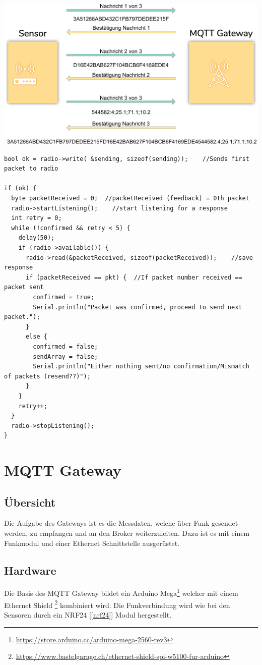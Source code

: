 \documentclass[
  12pt, %
  a4paper, %
  twoside, %
  openany, %
  numbers=noenddot, %
  BCOR=5mm, %
  parskip=half*, %
  thesis, %
]{bfhbook}
\begin{document}
\begin{center}
\includegraphics[width=17cm, left]{Bilder/Funkprotokoll.png}
 \captionsetup{justification=centering}
\label{radioprotocol}
\end{center}
\begin{verbatim}
bool ok = radio->write( &sending, sizeof(sending));    //Sends first packet to radio

if (ok) {
  byte packetReceived = 0;  //packetReceived (feedback) = 0th packet
  radio->startListening();    //start listening for a response
  int retry = 0;
  while (!confirmed && retry < 5) {
    delay(50);
    if (radio->available()) {
      radio->read(&packetReceived, sizeof(packetReceived));    //save response
      if (packetReceived == pkt) {  //If packet number received == packet sent
        confirmed = true;
        Serial.println("Packet was confirmed, proceed to send next packet.");
      }
      else {
        confirmed = false;
        sendArray = false;
        Serial.println("Either nothing sent/no confirmation/Mismatch of packets (resend??)");
      }
    }
    retry++;
  }
  radio->stopListening();
}
\end{verbatim}
\chapter{MQTT Gateway}
\section{Übersicht}
Die Aufgabe des \cite{mqtt} Gateways ist es die Messdaten, welche über Funk gesendet werden, zu empfangen und an den \cite{mqtt} Broker weiterzuleiten. Dazu ist es mit einem Funkmodul und einer Ethernet Schnittstelle ausgerüstet.
\section{Hardware}
Die Basis des MQTT Gateway bildet ein Arduino Mega\footnote{\url{https://store.arduino.cc/arduino-mega-2560-rev3}} welcher mit einem Ethernet Shield \footnote{\url{https://www.bastelgarage.ch/ethernet-shield-spi-w5100-fur-arduino}} kombiniert wird. Die Funkverbindung wird wie bei den Sensoren durch ein NRF24 [\ref{nrf24}] Modul hergestellt.
\end{document}
